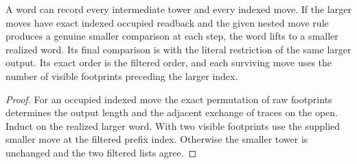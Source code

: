 \begin{proposition}
\label{hir:g8-indexed-occupied-word-lift}
\leanok
A word can record every intermediate tower and every indexed move.
If the larger moves have exact indexed occupied readback and the
given nested move rule produces a genuine smaller comparison at each
step, the word lifts to a smaller realized word. Its final comparison
is with the literal restriction of the same larger output. Its exact
order is the filtered order, and each surviving move uses the number
of visible footprints preceding the larger index.
\end{proposition}
\begin{proof}
For an occupied indexed move the exact permutation of raw footprints
determines the output length and the adjacent exchange of traces on
the open. Induct on the realized larger word. With two visible
footprints use the supplied smaller move at the filtered prefix
index. Otherwise the smaller tower is unchanged and the two
filtered lists agree.
\end{proof}

